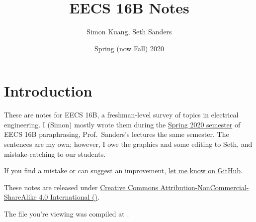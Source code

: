 \documentclass{../content16b}
\begin{document}
\title{EECS 16B Notes}
\author{Simon Kuang, Seth Sanders}
\date{Spring (now Fall) 2020}
\frontmatter
\maketitle

\section{Introduction}
These are notes for EECS 16B, a freshman-level survey of topics in electrical engineering. I (Simon) mostly wrote them during the \href{https://inst.eecs.berkeley.edu/~ee16b/sp20/}{Spring 2020 semester} of EECS 16B paraphrasing, Prof.~Sanders's lectures the same semester.
The sentences are my own; however, I owe the graphics and some editing to Seth, and mistake-catching to our students.

If you find a mistake or can suggest an improvement, \href{https://github.com/simontheflutist/eecs16b-notes}{let me know on GitHub}.

These notes are released under \href{https://creativecommons.org/licenses/by-nc-sa/4.0/}{Creative Commons Attribution-NonCommercial-ShareAlike 4.0 International (\ccbyncsa)}.

The file you're viewing was compiled at \DTMnow.

\newpage
\tableofcontents
\newpage
\listoffigures

\mainmatter
\renewcommand{\printchaptername}{\chapnamefont Lecture}






\end{document}
